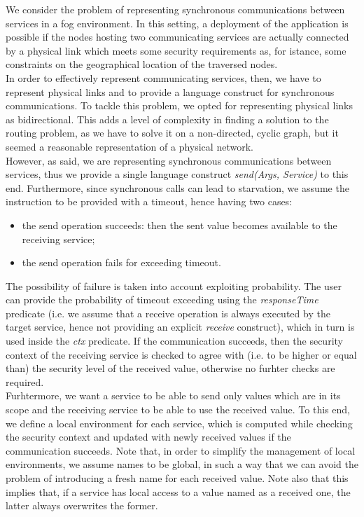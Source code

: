 \documentclass[../DraftNotes.tex]{subfiles}
\begin{document}
We consider the problem of representing synchronous communications between services in a fog environment. In this setting, a deployment of the application is possible if the nodes hosting two communicating services are actually connected by a physical link which meets some security requirements as, for istance, some constraints on the geographical location of the traversed nodes. \\
In order to effectively represent communicating services, then, we have to represent physical links and to provide a language construct for synchronous communications.
\smallskip
To tackle this problem, we opted for representing physical links as bidirectional. This adds a level of complexity in finding a solution to the routing problem, as we have to solve it on a non-directed, cyclic graph, but it seemed a reasonable representation of a physical network. \\
However, as said, we are representing synchronous communications between services, thus we provide a single language construct \emph{send(Args, Service)} to this end. Furthermore, since synchronous calls can lead to starvation, we assume the instruction to be provided with a timeout, hence having two cases:
\begin{itemize}
	\item the send operation succeeds: then the sent value becomes available to the receiving service;
	\item the send operation fails for exceeding timeout.
\end{itemize}
The possibility of failure is taken into account exploiting probability. The user can provide the probability of timeout exceeding using the \emph{responseTime} predicate (i.e. we assume that a receive operation is always executed by the target service, hence not providing an explicit \emph{receive} construct), which in turn is used inside the \emph{ctx} predicate. If the communication succeeds, then the security context of the receiving service is checked to agree with (i.e. to be higher or equal than) the security level of the received value, otherwise no furhter checks are required. \\
Furhtermore, we want a service to be able to send only values which are in its scope and the receiving service to be able to use the received value. To this end, we define a local environment for each service, which is computed while checking the security context and updated with newly received values if the communication succeeds. Note that, in order to simplify the management of local environments, we assume names to be global, in such a way that we can avoid the problem of introducing a fresh name for each received value. Note also that this implies that, if a service has local access to a value named as a received one, the latter always overwrites the former.
\end{document}
